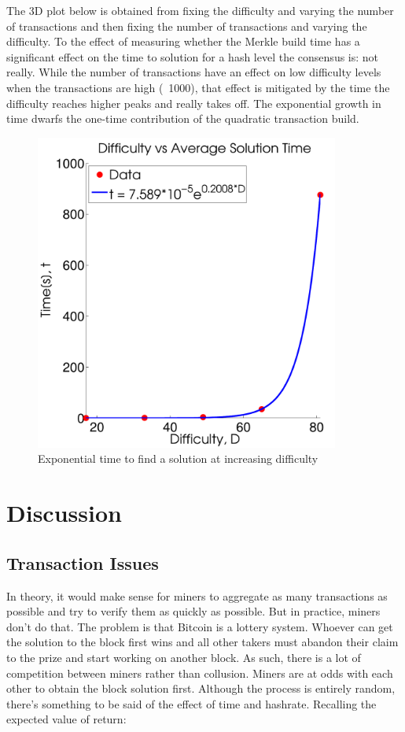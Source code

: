\documentclass[pdftex,11pt]{article}
\begin{document}
The 3D plot below is obtained from fixing the difficulty and varying the number of transactions and then fixing the number of transactions and varying the difficulty.  To the effect of measuring whether the Merkle build time has a significant effect on the time to solution for a hash level the consensus is: not really. While the number of transactions have an effect on low difficulty levels when the transactions are high (~1000), that effect is mitigated by the time the difficulty reaches higher peaks and really takes off. The exponential growth in time dwarfs the one-time contribution of the quadratic transaction build. 

\begin{figure}[H]
	\centering
	\includegraphics[width=100mm]{figures/SolveTimeExp.pdf}
	\caption{Exponential time to find a solution at increasing difficulty}
	\label{SolveTimeExp}
\end{figure}



\section{Discussion}

\subsection{Transaction Issues}
In theory, it would make sense for miners to aggregate as many transactions as possible and try to verify them as quickly as possible. But in practice, miners don't do that. The problem is that Bitcoin is a lottery system. Whoever can get the solution to the block first wins and all other takers must abandon their claim to the prize and start working on another block. As such, there is a lot of competition between miners rather than collusion. Miners are at odds with each other to obtain the block solution first. Although the process is entirely random, there’s something to be said of the effect of time and hashrate. Recalling the expected value of return:
\end{document}
